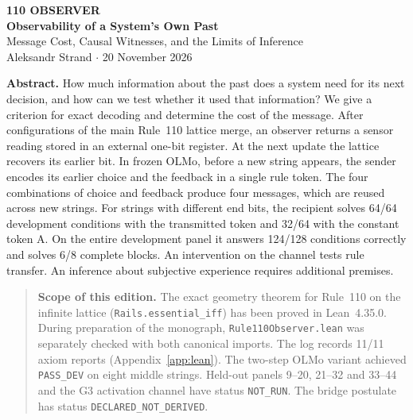 \documentclass[11pt,a4paper]{article}
\theoremstyle{definition}
\begin{document}
\sloppy
\begin{center}
{\small\bfseries\color{accent}110 OBSERVER}\\[7pt]
{\LARGE\bfseries Observability of a System's Own Past}\\[5pt]
{\large Message Cost, Causal Witnesses, and the Limits of Inference}\\[10pt]
Aleksandr Strand \hspace{1em} $\cdot$ \hspace{1em} 20 November 2026
\end{center}
\noindent\textbf{Abstract.} How much information about the past does a system need for its next decision, and how can we test whether it used that information? We give a criterion for exact decoding and determine the cost of the message. After configurations of the main Rule~110 lattice merge, an observer returns a sensor reading stored in an external one-bit register. At the next update the lattice recovers its earlier bit. In frozen OLMo, before a new string appears, the sender encodes its earlier choice and the feedback in a single rule token. The four combinations of choice and feedback produce four messages, which are reused across new strings. For strings with different end bits, the recipient solves 64/64 development conditions with the transmitted token and 32/64 with the constant token A. On the entire development panel it answers 124/128 conditions correctly and solves 6/8 complete blocks. An intervention on the channel tests rule transfer. An inference about subjective experience requires additional premises.

\begin{quote}\small\raggedright
\textbf{Scope of this edition.} The exact geometry theorem for Rule~110 on the infinite lattice (\texttt{Rails.essential\_iff}) has been proved in Lean~4.35.0. During preparation of the monograph, \texttt{Rule110Observer.lean} was separately checked with both canonical imports. The log records 11/11 axiom reports (Appendix~\ref{app:lean}). The two-step OLMo variant achieved \texttt{PASS\_DEV} on eight middle strings. Held-out panels 9--20, 21--32 and 33--44 and the G3 activation channel have status \texttt{NOT\_RUN}. The bridge postulate has status \texttt{DECLARED\_NOT\_DERIVED}.
\end{quote}

\end{document}
